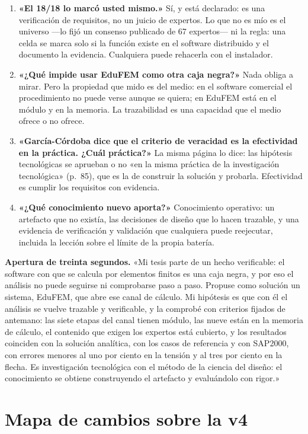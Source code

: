 \documentclass[11pt,a4paper]{article}
\begin{document}
\begin{enumerate}
\item \textbf{«El 18/18 lo marcó usted mismo.»} Sí, y está declarado: es una verificación de requisitos, no un juicio de expertos. Lo que no es mío es el universo —lo fijó un consenso publicado de 67 expertos— ni la regla: una celda se marca solo si la función existe en el software distribuido y el documento la evidencia. Cualquiera puede rehacerla con el instalador.
\item \textbf{«¿Qué impide usar EduFEM como otra caja negra?»} Nada obliga a mirar. Pero la propiedad que mido es del medio: en el software comercial el procedimiento no puede verse aunque se quiera; en EduFEM está en el módulo y en la memoria. La trazabilidad es una capacidad que el medio ofrece o no ofrece.
\item \textbf{«García-Córdoba dice que el criterio de veracidad es la efectividad en la práctica. ¿Cuál práctica?»} La misma página lo dice: las hipótesis tecnológicas se aprueban o no «en la misma práctica de la investigación tecnológica» (p.~85), que es la de construir la solución y probarla. Efectividad es cumplir los requisitos con evidencia.
\item \textbf{«¿Qué conocimiento nuevo aporta?»} Conocimiento operativo: un artefacto que no existía, las decisiones de diseño que lo hacen trazable, y una evidencia de verificación y validación que cualquiera puede reejecutar, incluida la lección sobre el límite de la propia batería.
\end{enumerate}

\textbf{Apertura de treinta segundos.} «Mi tesis parte de un hecho verificable: el software con que se calcula por elementos finitos es una caja negra, y por eso el análisis no puede seguirse ni comprobarse paso a paso. Propuse como solución un sistema, EduFEM, que abre ese canal de cálculo. Mi hipótesis es que con él el análisis se vuelve trazable y verificable, y la comprobé con criterios fijados de antemano: las siete etapas del canal tienen módulo, las nueve están en la memoria de cálculo, el contenido que exigen los expertos está cubierto, y los resultados coinciden con la solución analítica, con los casos de referencia y con SAP2000, con errores menores al uno por ciento en la tensión y al tres por ciento en la flecha. Es investigación tecnológica con el método de la ciencia del diseño: el conocimiento se obtiene construyendo el artefacto y evaluándolo con rigor.»

\section{Mapa de cambios sobre la v4}
\label{sec:cambios}
\end{document}
